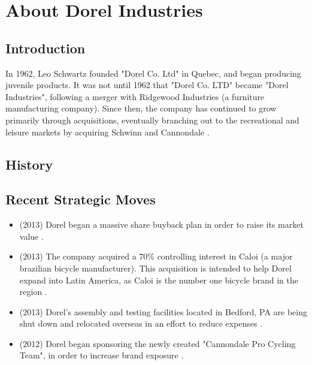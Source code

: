 \chapter{About Dorel Industries}
\label{chp:about}
\section{Introduction}
In 1962, Leo Schwartz founded "Dorel Co. Ltd" in Quebec, and began producing juvenile products.  It was not until 1962 that "Dorel Co. LTD" became "Dorel Industries", following a merger with Ridgewood Industries (a furniture manufacturing company).  Since then, the company has continued to grow primarily through acquisitions, eventually branching out to the recreational and leisure markets by acquiring Schwinn and Cannondale \cite{DorelIndustries2013}.

\section{History}


\section{Recent Strategic Moves}
\begin{itemize}
  \item (2013) Dorel began a massive share buyback plan in order to raise its market value \cite{Smith2014}.
  \item (2013) The company acquired a 70\% controlling interest in Caloi (a major brazilian bicycle manufacturer).  This acquisition is intended to help Dorel expand into Latin America, as Caloi is the number one bicycle brand in the region \cite{DorelIndustries2013}.
  \item (2013) Dorel’s assembly and testing facilities located in Bedford, PA are being shut down and relocated overseas in an effort to reduce expenses \cite{VoiceofAmerica2009}.
  \item (2012) Dorel began sponsoring the newly created "Cannondale Pro Cycling Team", in order to increase brand exposure \cite{DorelIndustries2012} .
\end{itemize}








